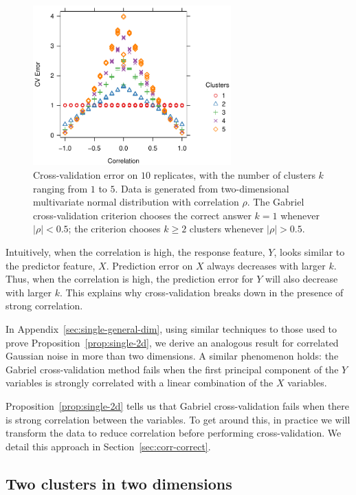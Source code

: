\documentclass[12pt]{article}
\begin{document}
\begin{figure}
\centering
\includegraphics[width=3in]{main_code/demo/nullcorr/equal.pdf}
\caption{Cross-validation error on $10$ replicates, with the number of
clusters $k$ ranging from $1$ to $5$.  Data is generated from two-dimensional
multivariate normal distribution with correlation $\rho$.  The Gabriel
cross-validation criterion chooses the correct answer $k = 1$ whenever
$|\rho| < 0.5$; the criterion chooses $k \geq 2$ clusters whenever $|\rho| > 0.5$.}
\label{fig:nullcorr-equal}
\end{figure}


Intuitively, when the correlation is high, the response feature, $Y$, looks
similar to the predictor feature, $X$. Prediction error on $X$ always
decreases with larger $k$. Thus, when the correlation is high, the prediction
error for $Y$ will also decrease with larger $k$. This explains why
cross-validation breaks down in the presence of strong correlation.


In Appendix~\ref{sec:single-general-dim}, using similar techniques to those used
to prove Proposition~\ref{prop:single-2d}, we derive an analogous result for correlated
Gaussian noise in more than two dimensions. A similar phenomenon holds:
the Gabriel cross-validation method fails when the first principal component
of the $Y$ variables is strongly correlated with a linear combination of the
$X$ variables.


Proposition~\ref{prop:single-2d} tells us that Gabriel cross-validation fails
when there is strong correlation between the variables. To get around this, in
practice we will transform the data to reduce correlation before performing
cross-validation. We detail this approach in Section~\ref{sec:corr-correct}.


\subsection{Two clusters in two dimensions}
\end{document}
